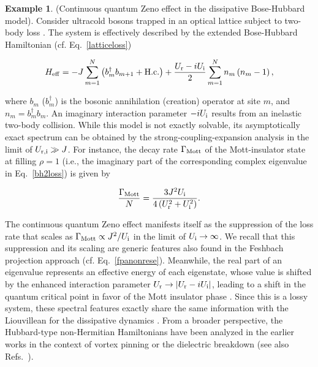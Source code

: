 \documentclass{tADP2e}
\theoremstyle{plain}
\newcommand{\eqn}[1]{
\begin{eqnarray}
	#1
\end{eqnarray}
}
\theoremstyle{plain}
\theoremstyle{definition}
\newtheorem{example}{Example}[section]
\newcommand{\exmp}[1]{
\begin{example}
	#1
\end{example}
}
\begin{document}
\exmp{(Continuous quantum Zeno effect in the dissipative Bose-Hubbard model). Consider ultracold bosons trapped in an optical lattice subject to two-body loss \cite{YA16crit,TT17}. The system is effectively described by the extended Bose-Hubbard Hamiltonian (cf. Eq.~\eqref{latticeloss})
\eqn{\label{bh2loss}
H_{{\rm eff}}=-J\sum_{m=1}^N\left(b_{m}^{\dagger}b_{m+1}+{\rm H.c.}\right)+\frac{U_{\rm r}-iU_{\rm i}}{2}\sum_{m=1}^N n_{m}\left(n_{m}-1\right),
}
where $b_m$ ($b_m^\dagger$) is the bosonic annihilation (creation) operator at site $m$, and $n_m=b_m^\dagger b_m$. An imaginary interaction parameter $-iU_{\rm i}$ results from an inelastic two-body collision. While this model is not exactly solvable, its asymptotically exact spectrum can be obtained by the strong-coupling-expansion analysis \cite{MF11} in the limit of $U_{{\rm r},{\rm i}}\gg J$. For instance, the decay rate $\Gamma_{\rm Mott}$ of the Mott-insulator state at filling $\rho=1$  (i.e., the imaginary part of the corresponding complex eigenvalue in Eq.~\eqref{bh2loss}) is given by \cite{YA16crit}
\eqn{\frac{\Gamma_{{\rm Mott}}}{N}=\frac{3J^{2}U_{\rm i}}{4\left(U_{\rm r}^{2}+U_{\rm i}^{2}\right)}.
}
The continuous quantum Zeno effect manifests itself as the suppression of the loss rate that scales as $\Gamma_{\rm Mott}\propto J^2/U_{\rm i}$ in the limit of $U_{\rm i}\to\infty$. We recall that this suppression and its scaling are generic features also found in the Feshbach projection approach (cf. Eq.~\eqref{fpanonrese}). Meanwhile, the real part of an eigenvalue represents an effective energy of each eigenstate, whose value is shifted by the enhanced interaction parameter $U_{\rm r}\to |U_{\rm r}-iU_{\rm i}|$, leading to a shift in the quantum critical point in favor of the Mott insulator phase \cite{YA16crit}. Since this is a lossy system, these spectral features exactly share  the same information with the Liouvillean for the dissipative dynamics \cite{BHJ93,TJM14}. From a broader perspective, the Hubbard-type non-Hermitian Hamiltonians have been analyzed in the earlier works \cite{LRA98,FT98} in the context of vortex pinning or the dielectric breakdown (see also Refs.~\cite{OT10,PA20,TK19}).
}
\end{document}
